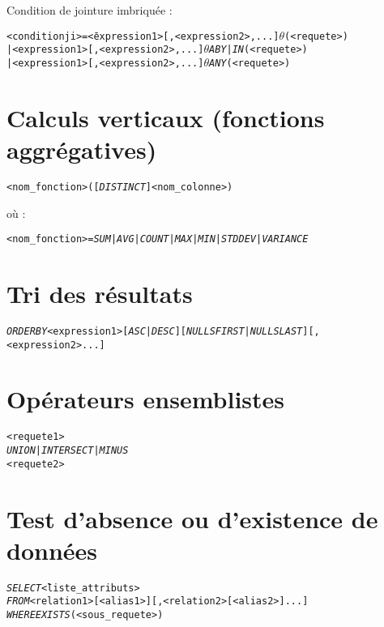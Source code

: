 \documentclass[10pt]{article}
\begin{document}
		Condition de jointure imbriquée :
		\begin{alltt}
			\begin{tabbing}
				<conditionji> = \= <expression1>[, <expression2>,...] \(\theta\) (<requete>)\\
								\> | <expression1>[, <expression2>,...] \(\theta\) \emph{ABY} | \emph{IN} (<requete>)\\
								\> | <expression1>[, <expression2>,...] \(\theta\) \emph{ANY} (<requete>)
			\end{tabbing}
		\end{alltt}
		
	\section{Calculs verticaux (fonctions aggrégatives)}
		\begin{alltt}
			<nom_fonction> ([\emph{DISTINCT}] <nom_colonne>)
		\end{alltt}
		où :
		\begin{alltt}
			<nom_fonction> = \emph{SUM} | \emph{AVG} | \emph{COUNT} | \emph{MAX} | \emph{MIN} | \emph{STDDEV} | \emph{VARIANCE}
		\end{alltt}
		
	\section{Tri des résultats}
		\begin{alltt}
			\emph{ORDER BY} <expression1> [\emph{ASC} | \emph{DESC}] [\emph{NULLS FIRST} | \emph{NULLS LAST}] [,<expression2> ...]
		\end{alltt}
		
	\section{Opérateurs ensemblistes}
		\begin{alltt}
			<requete1>
			\emph{UNION} | \emph{INTERSECT} | \emph{MINUS}
			<requete2>
		\end{alltt}
		
	\section{Test d'absence ou d'existence de données}
		\begin{alltt}
			\begin{tabbing}
				\emph{SELECT} \= <liste_attributs>\\
				\emph{FROM}    [<alias1>] [,<relation2> [<alias2>] ...]\\
				\emph{WHERE}  \emph{EXISTS} (<sous_requete>)
			\end{tabbing}
		\end{alltt}
		
\end{document}
